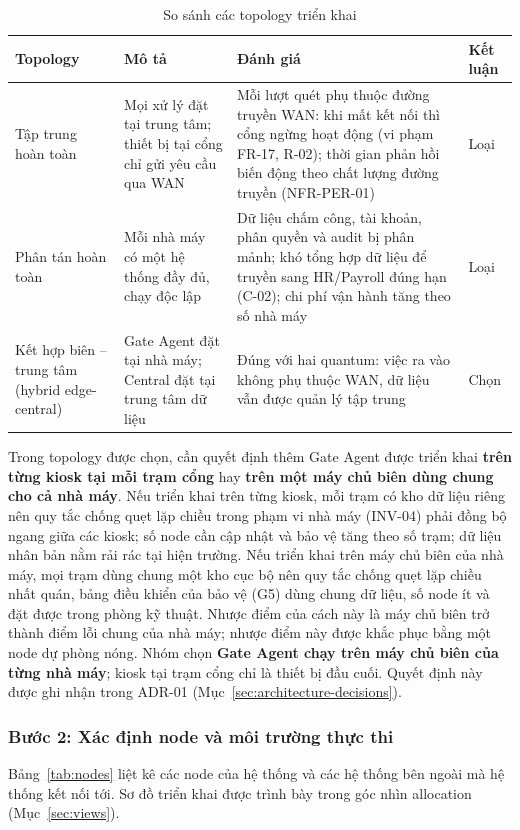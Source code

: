 \begin{table}[H]
\centering
\caption{So sánh các topology triển khai}\label{tab:topology-options}
\small
\renewcommand{\arraystretch}{1.3}
\begin{tabularx}{\textwidth}{|>{\raggedright\arraybackslash}p{3cm}|>{\raggedright\arraybackslash}p{4cm}|>{\raggedright\arraybackslash}X|>{\centering\arraybackslash}p{1.4cm}|}
\hline
\textbf{Topology} & \textbf{Mô tả} & \textbf{Đánh giá} & \textbf{Kết luận} \\
\hline
Tập trung hoàn toàn & Mọi xử lý đặt tại trung tâm; thiết bị tại cổng chỉ gửi yêu cầu qua WAN & Mỗi lượt quét phụ thuộc đường truyền WAN: khi mất kết nối thì cổng ngừng hoạt động (vi phạm FR-17, R-02); thời gian phản hồi biến động theo chất lượng đường truyền (NFR-PER-01) & Loại \\
\hline
Phân tán hoàn toàn & Mỗi nhà máy có một hệ thống đầy đủ, chạy độc lập & Dữ liệu chấm công, tài khoản, phân quyền và audit bị phân mảnh; khó tổng hợp dữ liệu để truyền sang HR/Payroll đúng hạn (C-02); chi phí vận hành tăng theo số nhà máy & Loại \\
\hline
Kết hợp biên -- trung tâm (hybrid edge-central) & Gate Agent đặt tại nhà máy; Central đặt tại trung tâm dữ liệu & Đúng với hai quantum: việc ra vào không phụ thuộc WAN, dữ liệu vẫn được quản lý tập trung & Chọn \\
\hline
\end{tabularx}
\end{table}

Trong topology được chọn, cần quyết định thêm Gate Agent được triển khai \textbf{trên từng kiosk tại mỗi trạm cổng} hay \textbf{trên một máy chủ biên dùng chung cho cả nhà máy}. Nếu triển khai trên từng kiosk, mỗi trạm có kho dữ liệu riêng nên quy tắc chống quẹt lặp chiều trong phạm vi nhà máy (INV-04) phải đồng bộ ngang giữa các kiosk; số node cần cập nhật và bảo vệ tăng theo số trạm; dữ liệu nhân bản nằm rải rác tại hiện trường. Nếu triển khai trên máy chủ biên của nhà máy, mọi trạm dùng chung một kho cục bộ nên quy tắc chống quẹt lặp chiều nhất quán, bảng điều khiển của bảo vệ (G5) dùng chung dữ liệu, số node ít và đặt được trong phòng kỹ thuật. Nhược điểm của cách này là máy chủ biên trở thành điểm lỗi chung của nhà máy; nhược điểm này được khắc phục bằng một node dự phòng nóng. Nhóm chọn \textbf{Gate Agent chạy trên máy chủ biên của từng nhà máy}; kiosk tại trạm cổng chỉ là thiết bị đầu cuối. Quyết định này được ghi nhận trong ADR-01 (Mục~\ref{sec:architecture-decisions}).

\subsubsection{Bước 2: Xác định node và môi trường thực thi}\label{sec:physical-step2}
Bảng~\ref{tab:nodes} liệt kê các node của hệ thống và các hệ thống bên ngoài mà hệ thống kết nối tới. Sơ đồ triển khai được trình bày trong góc nhìn allocation (Mục~\ref{sec:views}).

